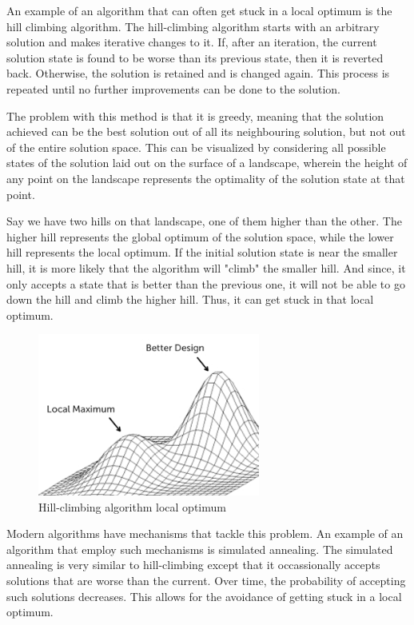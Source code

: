 \par An example of an algorithm that can often get stuck in a local optimum is the hill climbing algorithm. The hill-climbing algorithm starts with an arbitrary solution and makes iterative changes to it. If, after an iteration, the current solution state is found to be worse than its previous state, then it is reverted back. Otherwise, the solution is retained and is changed again. This process is repeated until no further improvements can be done to the solution.
\par The problem with this method is that it is greedy, meaning that the solution achieved can be the best solution out of all its neighbouring solution, but not out of the entire solution space. This can be visualized by considering all possible states of the solution laid out on the surface of a landscape, wherein the height of any point on the landscape represents the optimality of the solution state at that point.
\par Say we have two hills on that landscape, one of them higher than the other. The higher hill represents the global optimum of the solution space, while the lower hill represents the local optimum. If the initial solution state is near the smaller hill, it is more likely that the algorithm will "climb" the smaller hill. And since, it only accepts a state that is better than the previous one, it will not be able to go down the hill and climb the higher hill. Thus, it can get stuck in that local optimum.\par
\begin{figure}[h]
\begin{center}
\includegraphics[width=0.65\textwidth]{img/intro/hill_climbing}
\caption{Hill-climbing algorithm local optimum}
\end{center}
\end{figure}
\par Modern algorithms have mechanisms that tackle this problem. An example of an algorithm that employ such mechanisms is simulated annealing. The simulated annealing is very similar to hill-climbing except that it occassionally accepts solutions that are worse than the current. Over time, the probability of accepting such solutions decreases. This allows for the avoidance of getting stuck in a local optimum.

